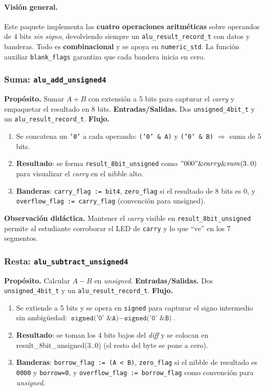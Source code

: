 \documentclass[a4paper,12pt]{article}
\begin{document}
\paragraph{Visión general.}
Este paquete implementa las \textbf{cuatro operaciones aritméticas} sobre operandos de \(4\) bits \emph{sin signo}, devolviendo siempre un \texttt{alu\_result\_record\_t} con datos y banderas. Todo es \textbf{combinacional} y se apoya en \texttt{numeric\_std}. La función auxiliar \texttt{blank\_flags} garantiza que cada bandera inicia en cero.

\subsubsection{Suma: \texttt{alu\_add\_unsigned4}}
\textbf{Propósito.} Sumar \(A+B\) con extensión a 5 bits para capturar el \emph{carry} y empaquetar el resultado en 8 bits.  
\textbf{Entradas/Salidas.} Dos \texttt{unsigned\_4bit\_t} y un \texttt{alu\_result\_record\_t}.  
\textbf{Flujo.}
\begin{enumerate}
  \item Se concatena un \texttt{'0'} a cada operando: \texttt{('0' \& A)} y \texttt{('0' \& B)} \(\Rightarrow\) suma de 5 bits.
  \item \textbf{Resultado}: se forma \texttt{result\_8bit\_unsigned} como \("000" \& carry \& sum(3..0)\) para visualizar el \emph{carry} en el nibble alto.
  \item \textbf{Banderas}: \texttt{carry\_flag := bit4}, \texttt{zero\_flag} si el resultado de 8 bits es 0, y \texttt{overflow\_flag := carry\_flag} (convención para unsigned).
\end{enumerate}
\textbf{Observación didáctica.} Mantener el \emph{carry} visible en \texttt{result\_8bit\_unsigned} permite al estudiante corroborar el LED de \texttt{carry} y lo que “ve” en los 7 segmentos.

\subsubsection{Resta: \texttt{alu\_subtract\_unsigned4}}
\textbf{Propósito.} Calcular \(A-B\) en \emph{unsigned}.  
\textbf{Entradas/Salidas.} Dos \texttt{unsigned\_4bit\_t} y un \texttt{alu\_result\_record\_t}.  
\textbf{Flujo.}
\begin{enumerate}
  \item Se extiende a 5 bits y se opera en \texttt{signed} para capturar el signo intermedio sin ambigüedad: \( \texttt{signed('0' \& A)} - \texttt{signed('0' \& B)}\).
  \item \textbf{Resultado}: se toman los 4 bits bajos del \textit{diff} y se colocan en 
  result\_8bit\_unsigned(3..0)
  (el resto del byte se pone a cero).
  \item \textbf{Banderas}: \texttt{borrow\_flag := (A < B)}, \texttt{zero\_flag} si el nibble de resultado es \texttt{0000} y \texttt{borrow=0}, y \texttt{overflow\_flag := borrow\_flag} como convención para \emph{unsigned}.
\end{enumerate}
\end{document}
